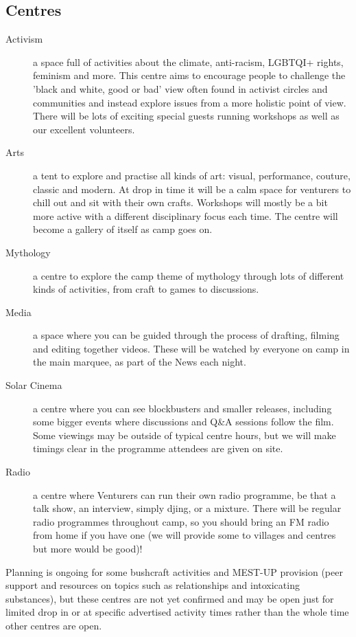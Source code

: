\documentclass[a4paper, 11pt]{report}
\begin{document}
\subsection{Centres}
\begin{description}
    \item[Activism] a space full of activities about the climate, anti-racism, LGBTQI+ rights, feminism and more. This centre aims to encourage people to challenge the 'black and white, good or bad' view often found in activist circles and communities and instead explore issues from a more holistic point of view. There will be lots of exciting special guests running workshops as well as our excellent volunteers.
    \item[Arts] a tent to explore and practise all kinds of art: visual, performance, couture, classic and modern. At drop in time it will be a calm space for venturers to chill out and sit with their own crafts. Workshops will mostly be a bit more active with a different disciplinary focus each time. The centre will become a gallery of itself as camp goes on.
    \item[Mythology] a centre to explore the camp theme of mythology through lots of  different kinds of activities, from craft to games to discussions.
    \item[Media] a space where you can be guided through the process of drafting, filming and editing together videos. These will be watched by everyone on camp in the main marquee, as part of the News each night.
    \item[Solar Cinema] a centre where you can see blockbusters and smaller releases, including some bigger events where discussions and Q\&A sessions follow the film. Some viewings may be outside of typical centre hours, but we will make timings clear in the programme attendees are given on site.
    \item[Radio] a centre where Venturers can run their own radio programme, be that a talk show, an interview, simply djing, or a mixture. There will be regular radio programmes throughout camp, so you should bring an FM radio from home if you have one (we will provide some to villages and centres but more would be good)!
\end{description}

Planning is ongoing for some bushcraft activities and MEST-UP provision (peer support and resources on topics such as relationships and intoxicating substances), but these centres are not yet confirmed and may be open just for limited drop in or at specific advertised activity times rather than the whole time other centres are open.
\end{document}
